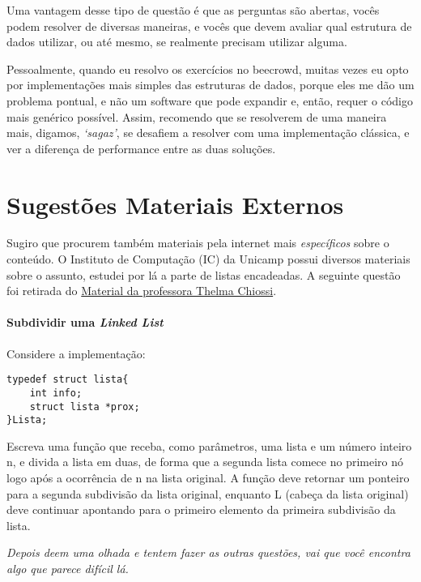 \documentclass[a4paper]{article}
\begin{document}
    Uma vantagem desse tipo de questão é que as perguntas são abertas, vocês
    podem resolver de diversas maneiras, e vocês que devem avaliar qual
    estrutura de dados utilizar, ou até mesmo, se realmente precisam utilizar
    alguma.

    Pessoalmente, quando eu resolvo os exercícios no beecrowd, muitas vezes eu
    opto por implementações mais simples das estruturas de dados, porque eles me
    dão um problema pontual, e não um software que pode expandir e, então,
    requer o código mais genérico possível. Assim, recomendo que se resolverem
    de uma maneira mais, digamos, \textit{`sagaz'}, se desafiem a resolver com uma
    implementação clássica, e ver a diferença de performance entre as duas
    soluções.
    \section*{Sugestões Materiais Externos}
    Sugiro que procurem também materiais pela internet mais \emph{específicos} sobre o
    conteúdo. O Instituto de Computação (IC) da Unicamp possui diversos
    materiais sobre o assunto, estudei por lá a parte de listas encadeadas.  A
    seguinte questão foi retirada do
    \href{https://www.ic.unicamp.br/~thelma/gradu/MC102/Turma-2008S2/Listas-exercicios/Lista6_exerc.pdf}{Material
    da professora Thelma Chiossi}. 

    \paragraph{Subdividir uma \textit{Linked List}\\}
    Considere a implementação:

    \begin{tcolorbox}
        \begin{verbatim}
typedef struct lista{
    int info;
    struct lista *prox;
}Lista;
        \end{verbatim}
    \end{tcolorbox}
    Escreva uma função que receba, como parâmetros, uma lista e um número inteiro n,
e divida a lista em duas, de forma que a segunda lista comece no primeiro nó logo
após a ocorrência de n na lista original. A função deve retornar um ponteiro para a
segunda subdivisão da lista original, enquanto L (cabeça da lista original) deve
continuar apontando para o primeiro elemento da primeira subdivisão da lista.

    \textit{ Depois deem uma olhada e tentem fazer as outras questões, vai que você
    encontra algo que parece difícil lá.}
\end{document}
